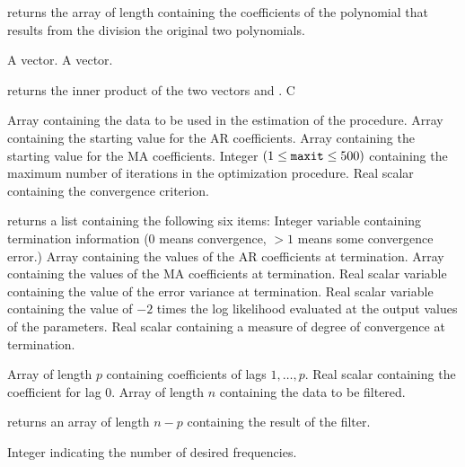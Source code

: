 \Sval
\Sitem{ }  returns the array {} of length {} 
containing the coefficients of the polynomial that results from the 
division the original two polynomials.
%
%


\Sarg
{} A vector.
 A vector.

\Sval
\Sitem{ }  returns the inner product of the two vectors {} 
and {}.
%
%
C

\Sarg
{} Array containing the data to be used in the estimation 
of the procedure.
 Array containing the starting value for the AR 
coefficients.
 Array containing the starting value for the MA 
coefficients.
 Integer $(1\le{\tt{maxit}}\le 500)$ containing 
the maximum number of iterations in the optimization procedure.
 Real scalar containing the convergence criterion.

\Sval
\Sitem{ }  returns a list containing the following 
six items:
 Integer variable containing termination information 
(0 means convergence, $>1$ means some convergence error.)
 Array containing the values of the AR coefficients at 
termination. 
 Array containing the values of the MA coefficients at 
termination.
 Real scalar variable containing the value of the error 
variance at termination.
 Real scalar variable containing the value of $-2$ times
the log likelihood evaluated at the output values of the parameters.
 Real scalar containing a measure of degree of convergence 
at termination.
%
%


\Sarg
{} Array of length $p$ containing coefficients of lags 
$1,\ldots,p$.
 Real scalar containing the coefficient for lag 0.
 Array of length $n$ containing the data to be filtered.

\Sval
\Sitem{ }  returns an array of length $n-p$ 
containing the result of the filter. 
%
%


\Sarg
{} Integer indicating the number of desired frequencies.

